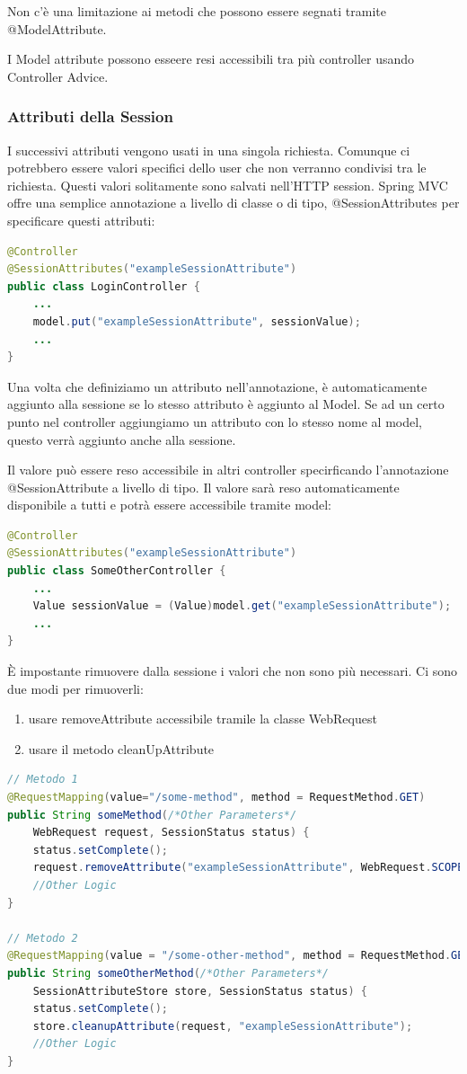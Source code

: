 \documentclass[11pt,a4paper]{book}
\begin{document}
Non c'è una limitazione ai metodi che possono essere segnati tramite @ModelAttribute.

I Model attribute possono esseere resi accessibili tra più controller usando Controller Advice.

\subsubsection{Attributi della Session}
I successivi attributi vengono usati in una singola richiesta. Comunque ci potrebbero essere valori specifici dello user che non verranno condivisi tra le richiesta. Questi valori solitamente sono salvati nell'HTTP session. Spring MVC offre una semplice annotazione a livello di classe o di tipo, @SessionAttributes per specificare questi attributi:
\begin{lstlisting}[language = Java]
@Controller
@SessionAttributes("exampleSessionAttribute")
public class LoginController {
	...
	model.put("exampleSessionAttribute", sessionValue);
	...
}
\end{lstlisting}

Una volta che definiziamo un attributo nell'annotazione, è automaticamente aggiunto alla sessione se lo stesso attributo è aggiunto al Model. Se ad un certo punto nel controller aggiungiamo un attributo con lo stesso nome al model, questo verrà aggiunto anche alla sessione.

Il valore può essere reso accessibile in altri controller specirficando l'annotazione @SessionAttribute a livello di tipo. Il valore sarà reso automaticamente disponibile a tutti e potrà essere accessibile tramite model:
\begin{lstlisting}[language = Java]
@Controller
@SessionAttributes("exampleSessionAttribute")
public class SomeOtherController {
	...
	Value sessionValue = (Value)model.get("exampleSessionAttribute");
	...
}
\end{lstlisting}

È impostante rimuovere dalla sessione i valori che non sono più necessari. Ci sono due modi per rimuoverli:
\begin{enumerate}
	\item usare removeAttribute accessibile tramile la classe WebRequest
	\item usare il metodo cleanUpAttribute
\end{enumerate}
\begin{lstlisting}[language = Java]
// Metodo 1
@RequestMapping(value="/some-method", method = RequestMethod.GET)
public String someMethod(/*Other Parameters*/
	WebRequest request, SessionStatus status) {
	status.setComplete();
	request.removeAttribute("exampleSessionAttribute", WebRequest.SCOPE_SESSION);
	//Other Logic
}

// Metodo 2
@RequestMapping(value = "/some-other-method", method = RequestMethod.GET)
public String someOtherMethod(/*Other Parameters*/
	SessionAttributeStore store, SessionStatus status) {
	status.setComplete();
	store.cleanupAttribute(request, "exampleSessionAttribute");
	//Other Logic
}
\end{lstlisting}
\end{document}
